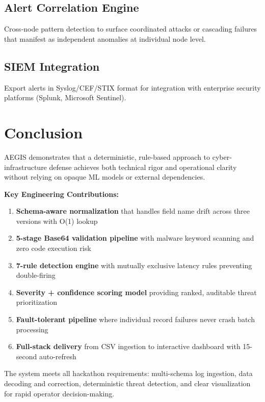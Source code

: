 \documentclass[12pt,a4paper]{article}
\begin{document}
\subsection{Alert Correlation Engine}

Cross-node pattern detection to surface coordinated attacks or cascading failures that manifest as independent anomalies at individual node level.

\subsection{SIEM Integration}

Export alerts in Syslog/CEF/STIX format for integration with enterprise security platforms (Splunk, Microsoft Sentinel).

\section{Conclusion}

AEGIS demonstrates that a deterministic, rule-based approach to cyber-infrastructure defense achieves both technical rigor and operational clarity without relying on opaque ML models or external dependencies.

\textbf{Key Engineering Contributions:}

\begin{enumerate}[noitemsep]
    \item \textbf{Schema-aware normalization} that handles field name drift across three versions with O(1) lookup
    \item \textbf{5-stage Base64 validation pipeline} with malware keyword scanning and zero code execution risk
    \item \textbf{7-rule detection engine} with mutually exclusive latency rules preventing double-firing
    \item \textbf{Severity + confidence scoring model} providing ranked, auditable threat prioritization
    \item \textbf{Fault-tolerant pipeline} where individual record failures never crash batch processing
    \item \textbf{Full-stack delivery} from CSV ingestion to interactive dashboard with 15-second auto-refresh
\end{enumerate}

The system meets all hackathon requirements: multi-schema log ingestion, data decoding and correction, deterministic threat detection, and clear visualization for rapid operator decision-making.
\end{document}
